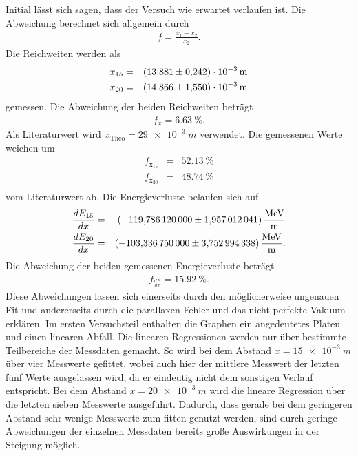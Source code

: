 Initial lässt sich sagen, dass der Versuch wie erwartet verlaufen ist.
Die Abweichung berechnet sich allgemein durch
\begin{align*}
  f=\frac{x_{\text{1}} - x_{\text{2}}}{x_{\text{2}}}.
\end{align*}
Die Reichweiten werden als
\begin{align*}
x_{\text{15}} &=& \SI{13.881 \pm 0.242e-3}{m}\\
x_{\text{20}} &=& \SI{14.866 \pm 1.550e-3}{m}\\
\end{align*}
gemessen.
Die Abweichung der beiden Reichweiten beträgt
\begin{align*}
  f_{x} = \SI{6.63}{\%}.
\end{align*}
Als Literaturwert wird $x_{\text{Theo}}=\SI{29e-3}{m}$ \cite{2} verwendet.
Die gemessenen Werte weichen um
\begin{align*}
  f_{\text{x}_{\text{15}}} &=& \SI{52.13}{\%}\\
  f_{\text{x}_{\text{20}}} &=& \SI{48.74}{\%}\\
\end{align*}
vom Literaturwert ab.
Die Energieverluste belaufen sich auf
\begin{align*}
  \frac{dE_{\text{15}}}{dx}  &=& \SI{-119.78612 \pm 1.957012041}{\frac{MeV}{m}}\\
  \frac{dE_{\text{20}}}{dx}  &=& \SI{-103.33675 \pm 3.752994338}{\frac{MeV}{m}}.\\
\end{align*}
Die Abweichung der beiden gemessenen Energieverluste beträgt
\begin{align*}
  f_{\frac{dE}{dx}} = \SI{15.92}{\%}.
\end{align*}
Diese Abweichungen lassen sich einerseits durch den möglicherweise ungenauen Fit und andererseits durch die parallaxen Fehler und das nicht perfekte Vakuum erklären.
Im ersten Versuchsteil enthalten die Graphen ein angedeutetes Plateu und einen linearen Abfall.
Die linearen Regressionen werden nur über bestimmte Teilbereiche der Messdaten gemacht.
So wird bei dem Abstand $x=\SI{15e-3}{m}$ über vier Messwerte gefittet, wobei auch hier der mittlere Messwert der letzten fünf Werte ausgelassen wird, da er eindeutig nicht dem sonstigen Verlauf entspricht.
Bei dem Abstand $x=\SI{20e-3}{m}$ wird die lineare Regression über die letzten sieben Messwerte ausgeführt.
Dadurch, dass gerade bei dem geringeren Abstand sehr wenige Messwerte zum fitten genutzt werden, sind durch geringe Abweichungen der einzelnen Messdaten bereits große Auswirkungen in der Steigung möglich.
